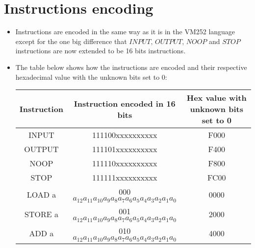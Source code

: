 \documentclass{article}
\begin{document}
\section{Instructions encoding}
\begin{itemize}
    \item Instructions are encoded in the same way as it is in the VM252 language except for the one big difference that $INPUT$, $OUTPUT$, $NOOP$ and $STOP$ instructions are now extended to be 16 bits instructions.
    \item The table below shows how the instructions are encoded and their respective hexadecimal value with the unknown bits set to 0: 
    \begin{center}
\begin{tabular}{ |c|c|c| } 
 \hline
 {\small Instruction} & {\small Instruction encoded in 16 bits} & {\small Hex value with unknown bits set to 0} \\ 
\hline
INPUT                                              & 111100xxxxxxxxxx                                       & F000                                                                  \\
OUTPUT                                             & 111101xxxxxxxxxx                                       & F400                                                                  \\
NOOP                                               & 111110xxxxxxxxxx                                       & F800                                                                  \\
STOP                                               & 111111xxxxxxxxxx                                       & FC00                                                                  \\
LOAD a                                             & 000$a_{12}a_{11}a_{10}a_9a_8a_7a_6a_5a_4a_3a_2a_1a_0$                                       & 0000                                                                  \\
STORE a                                            & 001$a_{12}a_{11}a_{10}a_9a_8a_7a_6a_5a_4a_3a_2a_1a_0$                                       & 2000                                                                  \\
ADD a                                              & 010$a_{12}a_{11}a_{10}a_9a_8a_7a_6a_5a_4a_3a_2a_1a_0$                                       & 4000                                                                  \\

\end{tabular}
\end{center}
\end{itemize}
\end{document}
